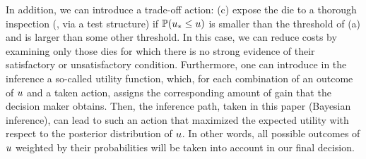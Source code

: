 In addition, we can introduce a trade-off action: (c) expose the die to a thorough inspection (\eg, via a test structure) if $\mathbb{P}(u_* \leq u)$ is smaller than the threshold of (a) and is larger than some other threshold. In this case, we can reduce costs by examining only those dies for which there is no strong evidence of their satisfactory or unsatisfactory condition.
Furthermore, one can introduce in the inference a so-called utility function, which, for each combination of an outcome of $u$ and a taken action, assigns the corresponding amount of gain that the decision maker obtains. Then, the inference path, taken in this paper (Bayesian inference), can lead to such an action that maximized the expected utility with respect to the posterior distribution of $u$. In other words, all possible outcomes of $u$ weighted by their probabilities will be taken into account in our final decision.
